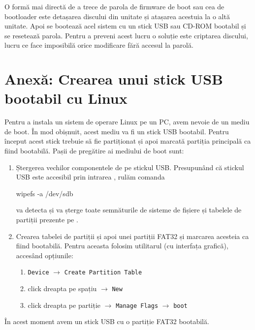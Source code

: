 O formă mai directă de a trece de parola de firmware de boot sau cea de
bootloader este detașarea discului din unitate și atașarea acestuia la o altă
unitate. Apoi se bootează acel sistem cu un stick USB sau CD-ROM bootabil și se
resetează parola. Pentru a preveni acest lucru o soluție este criptarea
discului, lucru ce face imposibilă orice modificare fără accesul la parolă.

\section{Anexă: Crearea unui stick USB bootabil cu Linux}
\label{sec:boot:usb-linux}

Pentru a instala un sistem de operare Linux pe un PC, avem nevoie de un mediu de
boot. În mod obișnuit, acest mediu va fi un stick USB bootabil. Pentru început
acest stick trebuie să fie partiționat și apoi marcată partiția principală ca
fiind bootabilă. Pașii de pregătire ai mediului de boot sunt:

\begin{enumerate}
  \item Ștergerea vechilor componentele de pe stickul USB. Presupunând că
          stickul USB este accesibil prin intrarea , rulăm
    comanda

\begin{screen}
wipefs -a /dev/sdb
\end{screen}

         va detecta și va șterge toate semnăturile de sisteme de fișiere
  și tabelele de partiții prezente pe .

  \item Crearea tabelei de partiții și apoi unei partiții FAT32 și
    marcarea acesteia ca fiind bootabilă. Pentru aceasta folosim
                utilitarul  (cu interfața grafică), accesând opțiunile:
    \begin{enumerate}
      \item \texttt{Device} $\rightarrow$ \texttt{Create Partition Table}
      \item click dreapta pe spațiu $\rightarrow$ \texttt{New}
      \item click dreapta pe partiție $\rightarrow$ \texttt{Manage Flags} $\rightarrow$ \texttt{boot}
    \end{enumerate}
\end{enumerate}

În acest moment avem un stick USB cu o partiție FAT32 bootabilă.

